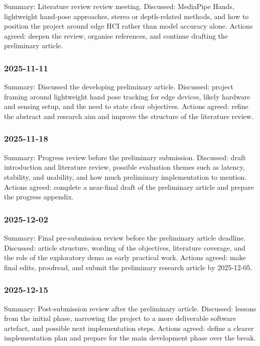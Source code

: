 ﻿\documentclass[11pt,a4paper]{article}
\begin{document}
Summary: Literature review review meeting.
Discussed: MediaPipe Hands, lightweight hand-pose approaches, stereo or
depth-related methods, and how to position the project around edge HCI rather
than model accuracy alone.
Actions agreed: deepen the review, organise references, and continue drafting
the preliminary article.

\subsubsection*{2025-11-11}

Summary: Discussed the developing preliminary article.
Discussed: project framing around lightweight hand pose tracking for edge
devices, likely hardware and sensing setup, and the need to state clear
objectives.
Actions agreed: refine the abstract and research aim and improve the structure
of the literature review.

\subsubsection*{2025-11-18}

Summary: Progress review before the preliminary submission.
Discussed: draft introduction and literature review, possible evaluation themes
such as latency, stability, and usability, and how much preliminary
implementation to mention.
Actions agreed: complete a near-final draft of the preliminary article and
prepare the progress appendix.

\subsubsection*{2025-12-02}

Summary: Final pre-submission review before the preliminary article deadline.
Discussed: article structure, wording of the objectives, literature coverage,
and the role of the exploratory demo as early practical work.
Actions agreed: make final edits, proofread, and submit the preliminary
research article by 2025-12-05.

\subsubsection*{2025-12-15}

Summary: Post-submission review after the preliminary article.
Discussed: lessons from the initial phase, narrowing the project to a more
deliverable software artefact, and possible next implementation steps.
Actions agreed: define a clearer implementation plan and prepare for the main
development phase over the break.
\end{document}
